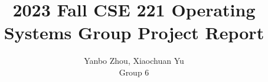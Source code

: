\documentclass[letterpaper,twocolumn,10pt]{usetex-v1}
\begin{document}

\date{}


\title{2023 Fall CSE 221 Operating Systems Group Project Report}

\author{{Yanbo Zhou, Xiaochuan Yu} \\ Group 6}

\maketitle











%
\end{document}

